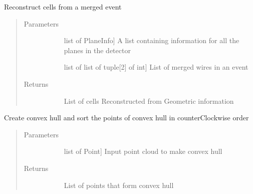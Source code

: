 \documentclass[letterpaper,10pt,english]{sphinxmanual}
\begin{document}
\begin{fulllineitems}
\label{\detokenize{geometryReco:geometryReco.reconstructCells}}
Reconstruct cells from a merged event
\begin{quote}\begin{description}
\item[{Parameters}] \leavevmode\begin{description}
\item[{}] \leavevmode{[}list of PlaneInfo{]}
A list containing information for all the planes in the detector

\item[{}] \leavevmode{[}list of list of tuple{[}2{]} of int{]}
List of merged wires in an event

\end{description}

\item[{Returns}] \leavevmode\begin{description}
\item[{}] \leavevmode
List of cells Reconstructed from Geometric information

\end{description}

\end{description}\end{quote}

\end{fulllineitems}


\begin{fulllineitems}
\label{\detokenize{geometryReco:geometryReco.sortPoints}}
Create convex hull and sort the points of convex hull in counterClockwise order
\begin{quote}\begin{description}
\item[{Parameters}] \leavevmode\begin{description}
\item[{}] \leavevmode{[}list of Point{]}
Input point cloud to make convex hull

\end{description}

\item[{Returns}] \leavevmode\begin{description}
\item[{}] \leavevmode
List of points that form convex hull

\end{description}

\end{description}\end{quote}

\end{fulllineitems}
\end{document}
